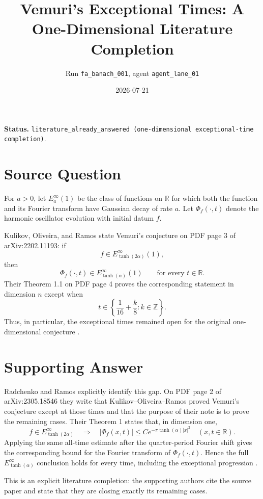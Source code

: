 \documentclass[11pt]{article}
\title{Vemuri's Exceptional Times: A One-Dimensional Literature Completion}
\author{Run \texttt{fa\_banach\_001}, agent \texttt{agent\_lane\_01}}
\date{2026-07-21}
\begin{document}
\maketitle

\noindent\textbf{Status.}
\texttt{literature\_already\_answered (one-dimensional exceptional-time completion)}.

\section*{Source Question}

For \(a>0\), let \(E_a^\infty(1)\) be the class of functions on
\(\mathbb R\) for which both the function and its Fourier transform have
Gaussian decay of rate \(a\).  Let \(\Phi_f(\cdot,t)\) denote the harmonic
oscillator evolution with initial datum \(f\).

Kulikov, Oliveira, and Ramos state Vemuri's conjecture on PDF page 3 of
arXiv:2202.11193: if
\[
  f\in E_{\tanh(2\alpha)}^\infty(1),
\]
then
\[
  \Phi_f(\cdot,t)\in E_{\tanh(\alpha)}^\infty(1)
  \qquad\text{for every }t\in\mathbb R.
\]
Their Theorem 1.1 on PDF page 4 proves the corresponding statement in
dimension \(n\) except when
\[
  t\in\left\{\frac{1}{16}+\frac{k}{8}:k\in\mathbb Z\right\}.
\]
Thus, in particular, the exceptional times remained open for the original
one-dimensional conjecture \cite{KOR}.

\section*{Supporting Answer}

Radchenko and Ramos explicitly identify this gap.  On PDF page 2 of
arXiv:2305.18546 they write that Kulikov--Oliveira--Ramos proved Vemuri's
conjecture except at those times and that the purpose of their note is to
prove the remaining cases.  Their Theorem 1 states that, in dimension one,
\[
  f\in E_{\tanh(2\alpha)}^\infty
  \quad\Longrightarrow\quad
  |\Phi_f(x,t)|\le C e^{-\pi\tanh(\alpha)|x|^2}
  \quad(x,t\in\mathbb R).
\]
Applying the same all-time estimate after the quarter-period Fourier shift
gives the corresponding bound for the Fourier transform of
\(\Phi_f(\cdot,t)\).  Hence the full \(E_{\tanh(\alpha)}^\infty\) conclusion
holds for every time, including the exceptional progression \cite{RR}.

This is an explicit literature completion: the supporting authors cite the
source paper and state that they are closing exactly its remaining cases.
\end{document}
